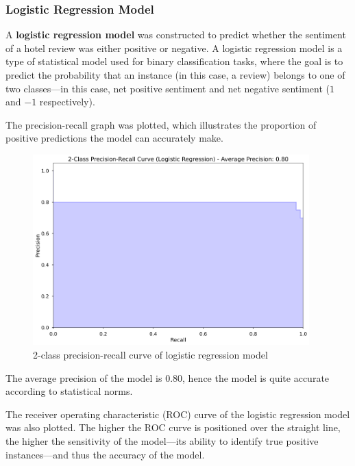 \documentclass[12pt, bibliography=totocnumbered, paper=a4]{scrartcl}
\def\bf#1{\textbf{#1}}
\begin{document}
\subsubsection{Logistic Regression Model}
A \bf{logistic regression model} was constructed to predict whether the sentiment
of a hotel review was either positive or negative. A logistic regression model
is a type of statistical model used for binary classification tasks, where the goal
is to predict the probability that an instance (in this case, a review) belongs to one of two classes---in
this case, net positive sentiment and net negative sentiment ($1$ and $-1$ respectively).

The precision-recall graph was plotted, which illustrates the proportion of positive
predictions the model can accurately make.

\begin{figure}[htpb]
	\begin{center}
		\includegraphics[width=0.95\textwidth]{rq3/prec-recall_logreg.png}
	\end{center}
	\caption{2-class precision-recall curve of logistic regression model}
	\label{fig:lg-prcurve}
\end{figure}

The average precision of the model is $0.80$, hence the model is quite accurate
according to statistical norms.

The receiver operating characteristic (ROC) curve of the logistic regression model
was also plotted. The higher the ROC curve is positioned over the straight line, the higher
the sensitivity of the model---its ability to identify true positive instances---and
thus the accuracy of the model.
\end{document}
